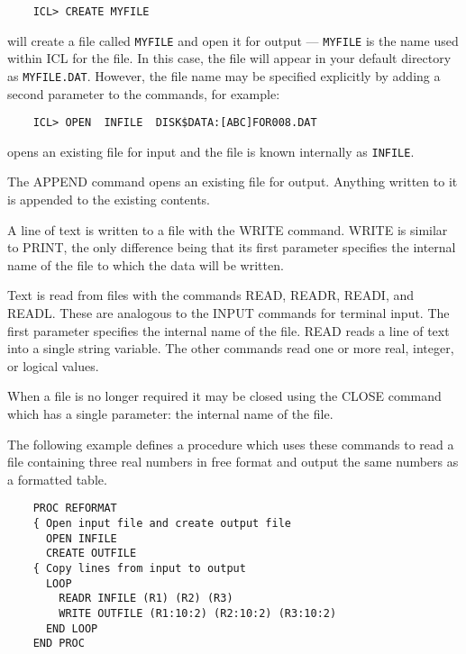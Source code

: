 \begin{small}
\begin{verbatim}
    ICL> CREATE MYFILE
\end{verbatim}
\end{small}

will create a file called {\small\tt MYFILE} and open it for output ---
{\small\tt MYFILE} is the name used within ICL for the file.
In this case, the file will appear in your default directory as
{\small\tt MYFILE.DAT}.
However, the file name may be specified explicitly by adding a second parameter
to the commands, for example:

\begin{small}
\begin{verbatim}
    ICL> OPEN  INFILE  DISK$DATA:[ABC]FOR008.DAT
\end{verbatim}
\end{small}

opens an existing file for input and the file is known internally as
{\small\tt INFILE}.

The APPEND command opens an existing file for output.
Anything written to it is appended to the existing contents.

A line of text is written to a file with the WRITE command.
WRITE is similar to PRINT, the only difference being that its first parameter
specifies the internal name of the file to which the data will be written.

Text is read from files with the commands READ, READR, READI, and READL.
These are analogous to the INPUT commands for terminal input.
The first parameter specifies the internal name of the file.
READ reads a line of text into a single string variable.
The other commands read one or more real, integer, or logical values.

When a file is no longer required it may be closed using the CLOSE command
which has a single parameter: the internal name of the file.

The following example defines a procedure which uses these commands to read a
file containing three real numbers in free format and output the same numbers
as a formatted table.

\begin{small}
\begin{verbatim}
    PROC REFORMAT
    { Open input file and create output file
      OPEN INFILE
      CREATE OUTFILE
    { Copy lines from input to output
      LOOP
        READR INFILE (R1) (R2) (R3)
        WRITE OUTFILE (R1:10:2) (R2:10:2) (R3:10:2)
      END LOOP
    END PROC
\end{verbatim}
\end{small}

